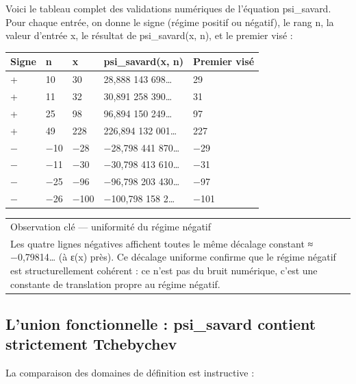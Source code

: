 \documentclass[11pt,a4paper]{article}
\newcommand{\ColorTableHeader}{\rowcolor{TableHeader}}
\begin{document}
Voici le tableau complet des validations numériques de l'équation psi\_savard. Pour chaque entrée, on donne le signe (régime positif ou négatif), le rang n, la valeur d'entrée x, le résultat de psi\_savard(x, n), et le premier visé :

\begin{exampleblock}[title={Validations numériques du pont Savard}]


\begin{longtable}{|p{}|p{}|p{}|p{}|p{}|}
\hline
\ColorTableHeader
Signe & n & x & psi\_savard(x, n) & Premier visé \\
\hline
+ & 10 & 30 & 28,888 143 698… & 29 \\
\hline
+ & 11 & 32 & 30,891 258 390… & 31 \\
\hline
+ & 25 & 98 & 96,894 150 249… & 97 \\
\hline
+ & 49 & 228 & 226,894 132 001… & 227 \\
\hline
− & −10 & −28 & −28,798 441 870… & −29 \\
\hline
− & −11 & −30 & −30,798 413 610… & −31 \\
\hline
− & −25 & −96 & −96,798 203 430… & −97 \\
\hline
− & −26 & −100 & −100,798 158 2… & −101 \\
\hline
\end{longtable}



\begin{longtable}{|p{}|}
\hline
Observation clé — uniformité du régime négatif \\ Les quatre lignes négatives affichent toutes le même décalage constant ≈ −0,79814… (à ε(x) près). Ce décalage uniforme confirme que le régime négatif est structurellement cohérent : ce n'est pas du bruit numérique, c'est une constante de translation propre au régime négatif. \\
\hline
\end{longtable}

\end{exampleblock}


\subsection{L'union fonctionnelle : psi\_savard contient strictement Tchebychev}

La comparaison des domaines de définition est instructive :
\end{document}
